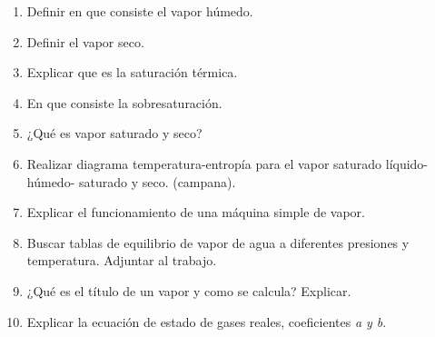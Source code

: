 \documentclass[../main]{subfiles}
\begin{document}
\begin{enumerate}
  \item Definir en que consiste el vapor húmedo.
  \item Definir el vapor seco.
  \item Explicar que es la saturación térmica.
  \item En que consiste la sobresaturación.
  \item ¿Qué es vapor saturado y seco?
  \item Realizar diagrama temperatura-entropía para el vapor saturado
    líquido-húmedo- saturado y seco. (campana).
  \item Explicar el funcionamiento de una máquina simple de vapor.
  \item Buscar tablas de equilibrio de vapor de agua a diferentes
    presiones y temperatura. Adjuntar al trabajo.
  \item ¿Qué es el título de un vapor y como se calcula? Explicar.
  \item Explicar la ecuación de estado de gases reales, coeficientes
    \emph{a y b}.
\end{enumerate}
\end{document}
